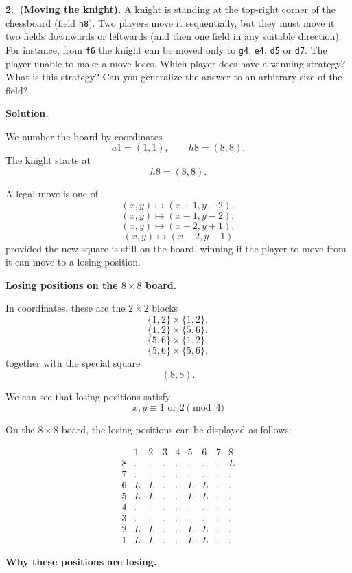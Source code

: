 \textbf{2.\ (Moving the knight).}
A knight is standing at the top-right corner of the chessboard (field \texttt{h8}).
Two players move it sequentially, but they must move it two fields downwards or leftwards (and then one field in any suitable direction).
For instance, from \texttt{f6} the knight can be moved only to \texttt{g4}, \texttt{e4}, \texttt{d5} or \texttt{d7}.
The player unable to make a move loses.
Which player does have a winning strategy?
What is this strategy?
Can you generalize the answer to an arbitrary size of the field?

\textbf{Solution.}

We number the board by coordinates
\[
a1=(1,1),\qquad h8=(8,8).
\]
The knight starts at
\[
h8=(8,8).
\]

A legal move is one of
\[
(x,y)\mapsto (x+1,y-2),
\]
\[
(x,y)\mapsto (x-1,y-2),
\]
\[
(x,y)\mapsto (x-2,y+1),
\]
\[
(x,y)\mapsto (x-2,y-1)
\]
provided the new square is still on the board.
winning if the player to move from it can move to a losing position.

\medskip
\noindent\textbf{Losing positions on the \(8\times 8\) board.}

In coordinates, these are the \(2\times2\) blocks
\[
\{1,2\}\times\{1,2\},
\]
\[
\{1,2\}\times\{5,6\},
\]
\[
\{5,6\}\times\{1,2\},
\]
\[
\{5,6\}\times\{5,6\},
\]
together with the special square
\[
(8,8).
\]

We can see that losing positions satisfy
\[
x,y\equiv 1 \text{ or } 2 \pmod 4
\]

On the \(8\times 8\) board, the losing positions can be displayed as follows:

\[
\begin{array}{c|cccccccc}
& 1 & 2 & 3 & 4 & 5 & 6 & 7 & 8\\
\hline
8 & . & . & . & . & . & . & . & L\\
7 & . & . & . & . & . & . & . & .\\
6 & L & L & . & . & L & L & . & .\\
5 & L & L & . & . & L & L & . & .\\
4 & . & . & . & . & . & . & . & .\\
3 & . & . & . & . & . & . & . & .\\
2 & L & L & . & . & L & L & . & .\\
1 & L & L & . & . & L & L & . & .
\end{array}
\]

\medskip
\noindent\textbf{Why these positions are losing.}

